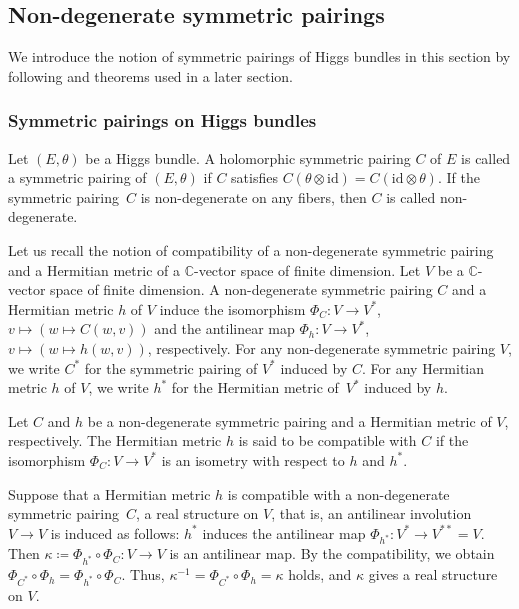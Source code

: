 \documentclass[pdftex]{sigma}
\numberwithin{equation}{section}
\newcommand{\C}{\mathbb{C}}
\newcommand{\id}{\mathrm{id}}
\begin{document}
\subsection{Non-degenerate symmetric pairings}
We introduce the notion of symmetric pairings of Higgs bundles in this section by following \cite{LM1} and theorems used in a later section.
\subsubsection{Symmetric pairings on Higgs bundles}
\begin{Definition}
 Let $(E,\theta)$ be a Higgs bundle. A holomorphic symmetric pairing $C$ of $E$ is called a symmetric pairing of $(E,\theta)$ if $C$ satisfies $C(\theta\otimes\id)= C(\id\otimes\theta)$. If the symmetric pairing~$C$ is non-degenerate on any fibers, then $C$ is called non-degenerate.
\end{Definition}

Let us recall the notion of compatibility of a non-degenerate symmetric pairing and a Hermitian metric of a $\C$-vector space of finite dimension. Let $V$ be a $\C$-vector space of finite dimension. A non-degenerate symmetric pairing $C$ and a Hermitian metric $h$ of $V$ induce the isomorphism $\Phi_C\colon V\to V^{*}$, $v\mapsto (w\mapsto C(w,v))$ and the antilinear map $\Phi_h\colon V\to V^{*}$, $v\mapsto (w\mapsto h(w,v))$, respectively. For any non-degenerate symmetric pairing $V$, we write $C^{*}$ for the symmetric pairing of $V^{*}$ induced by $C$. For any Hermitian metric $h$ of $V$, we write $h^{*}$ for the Hermitian metric of~$V^{*}$ induced by $h$.
\begin{Definition}
 Let $C$ and $h$ be a non-degenerate symmetric pairing and a Hermitian metric of $V$, respectively. The Hermitian metric $h$ is said to be compatible with $C$ if the isomorphism $\Phi_C\colon V\to V^{*}$ is an isometry with respect to $h$ and $h^{*}$.
\end{Definition}
Suppose that a Hermitian metric $h$ is compatible with a non-degenerate symmetric pairing~$C$, a real structure on $V$, that is, an antilinear involution $V\to V$ is induced as follows: $h^{*}$ induces the antilinear map $\Phi_{h^{*}}\colon V^{*}\to V^{**}=V$. Then $\kappa \coloneqq \Phi_{h^{*}}\circ \Phi_{C}\colon V\to V$ is an antilinear map. By the compatibility, we obtain $\Phi_{C^*}\circ \Phi_{h} = \Phi_{h^*}\circ \Phi_{C}$. Thus, ${\kappa}^{-1} = \Phi_{C^*}\circ \Phi_{h} = \kappa$ holds, and $\kappa$ gives a real structure on $V$.
\end{document}
